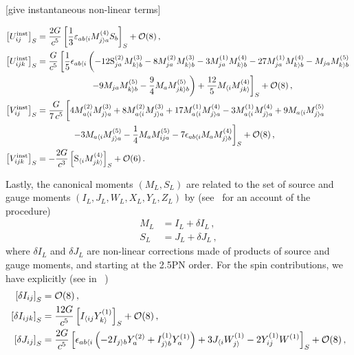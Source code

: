 \documentclass[
superscriptaddress,
preprint,
prd,tightenlines,showpacs,nofootinbib,
eqsecnum,
amsfonts,amsmath,amssymb]{revtex4-1}
\newcommand{\calO}{\mathcal{O}}
\newcommand{\phfrac}{\vphantom{\frac{1}{2}}}
\newcommand{\nn}{\nonumber}
\begin{document}
[give instantaneous non-linear terms]

\begin{subequations}
\begin{align}
	\left[U_{ij}^{\rm inst} \right]_{S} &= \frac{2G}{c^{5}} \left[ \frac{1}{3} \varepsilon_{ab\langle i} M_{j\rangle a}^{(4)}S_{b}\right]_{S} + \calO(8) \,,\\
	\left[U_{ijk}^{\rm inst} \right]_{S} &= \frac{G}{c^{5}} \left[ {1\over5}\epsilon_{ab\langle  i}\left( -12\mathrm{S}^{(2)}_{ja}M^{(3)}_{k\rangle b} - 8M^{(2)}_{ja}M^{(3)}_{k\rangle b} -3M^{(1)}_{ja}M^{(4)}_{k\rangle b} -27M^{(1)}_{ja}M^{(4)}_{k\rangle b}-M_{ja}M^{(5)}_{k\rangle b} \phfrac\right.\right. \nn\\
    & \qquad\qquad\qquad \left.\left. -9M_{ja}M^{(5)}_{k\rangle b} -{9\over4}M_{a}M^{(5)}_{jk\rangle b}\right)+{12\over5}M_{\langle i}M^{(4)}_{jk\rangle} \right]_{S} + \calO(8) \,,\\
	\left[V_{ij}^{\rm inst} \right]_{S} &= {G\over7\,c^{5}} \left[ 4M^{(2)}_{a\langle i}M^{(3)}_{j\rangle a}+8M^{(2)}_{a\langle i}M^{(3)}_{j\rangle a} +17M^{(1)}_{a\langle i}M^{(4)}_{j\rangle a}-3M^{(1)}_{a\langle i}M^{(4)}_{j\rangle a}+9M_{a\langle i}M^{(5)}_{j\rangle a} \phfrac\right. \nn\\
    & \qquad\qquad \left. - 3M_{a\langle i}M^{(5)}_{j\rangle a}-{1\over4}M_{a}M^{(5)}_{ija}-7\epsilon_{ab\langle i}M_{a}M^{(4)}_{j\rangle b} \right]_{S} + \calO(8) \,,\\
	\left[V_{ijk}^{\rm inst} \right]_{S} &= -\frac{2G}{c^{3}} \left[ \mathrm{S}_{\langle i}M^{(4)}_{jk\rangle } \right]_{S} + \calO(6) \,.\\
\end{align}
\end{subequations}

Lastly, the canonical moments $(M_{L},S_{L})$ are related to the set of source and gauge moments $(I_{L},J_{L},W_{L},X_{L},Y_{L},Z_{L})$ by (see~\cite{BFIS08} for an account of the procedure)
\begin{subequations}
\begin{align}
	M_{L} &= I_{L} + \delta I_{L} \,,\\
	S_{L} &= J_{L} + \delta J_{L} \,,
\end{align}
\end{subequations}
where $\delta I_{L}$ and $\delta J_{L}$ are non-linear corrections made of products of source and gauge moments, and starting at the 2.5PN order. For the spin contributions, we have explicitly (see in ~\cite{})
\begin{subequations}
\begin{align}
	\left[ \delta I_{ij} \right]_{S} &= \calO(8) \,,\\
	\left[ \delta I_{ijk} \right]_{S} &= {12G\over c^5}\left[ I_{\langle ij}Y_{k\rangle }^{(1)} \right]_{S} +\calO(8) \,,\\
	\left[ \delta J_{ij}\right]_{S} &= {2G\over c^5}\left[\epsilon_{ab\langle i}\left(-2I_{j\rangle b}Y_{a}^{(2)} +I_{j\rangle b}^{(1)}Y_{a}^{(1)}\right)+3J_{\langle i}W_{j\rangle}^{(1)}-2Y_{ij}^{(1)}W^{(1)}\right]_{S} +\calO(8) \,,
\end{align}
\end{subequations}
\end{document}
